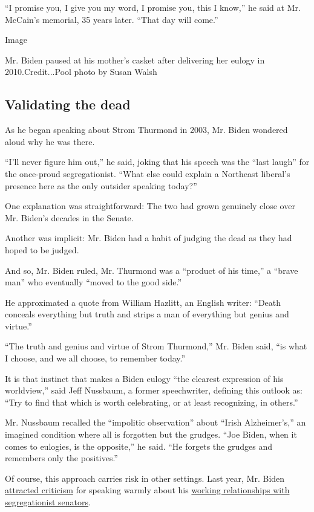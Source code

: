 ``I promise you, I give you my word, I promise you, this I know,'' he
said at Mr. McCain's memorial, 35 years later. ``That day will come.''

Image

Mr. Biden paused at his mother's casket after delivering her eulogy in
2010.Credit...Pool photo by Susan Walsh

\hypertarget{validating-the-dead}{%
\subsection{Validating the dead}\label{validating-the-dead}}

As he began speaking about Strom Thurmond in 2003, Mr. Biden wondered
aloud why he was there.

``I'll never figure him out,'' he said, joking that his speech was the
``last laugh'' for the once-proud segregationist. ``What else could
explain a Northeast liberal's presence here as the only outsider
speaking today?''

One explanation was straightforward: The two had grown genuinely close
over Mr. Biden's decades in the Senate.

Another was implicit: Mr. Biden had a habit of judging the dead as they
had hoped to be judged.

And so, Mr. Biden ruled, Mr. Thurmond was a ``product of his time,'' a
``brave man'' who eventually ``moved to the good side.''

He approximated a quote from William Hazlitt, an English writer: ``Death
conceals everything but truth and strips a man of everything but genius
and virtue.''

``The truth and genius and virtue of Strom Thurmond,'' Mr. Biden said,
``is what I choose, and we all choose, to remember today.''

It is that instinct that makes a Biden eulogy ``the clearest expression
of his worldview,'' said Jeff Nussbaum, a former speechwriter, defining
this outlook as: ``Try to find that which is worth celebrating, or at
least recognizing, in others.''

Mr. Nussbaum recalled the ``impolitic observation'' about ``Irish
Alzheimer's,'' an imagined condition where all is forgotten but the
grudges. ``Joe Biden, when it comes to eulogies, is the opposite,'' he
said. ``He forgets the grudges and remembers only the positives.''

Of course, this approach carries risk in other settings. Last year, Mr.
Biden
\href{https://www.nytimes.com/2019/06/19/us/politics/biden-eastland.html}{attracted
criticism} for speaking warmly about his
\href{https://www.nytimes.com/2019/06/19/us/politics/biden-segregationists.html}{working
relationships with segregationist senators}.

